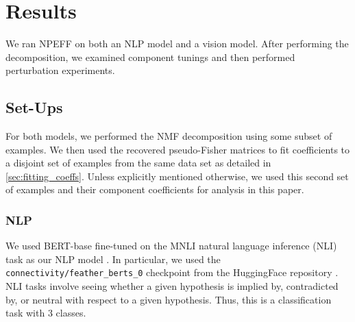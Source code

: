 \documentclass[dvipsnames]{article}
\begin{document}




\section{Results}
We ran NPEFF on both an NLP model and a vision model.
After performing the decomposition, we examined component tunings and then performed perturbation experiments.

\subsection{Set-Ups}
For both models, we performed the NMF decomposition using some subset of examples. We then used the recovered pseudo-Fisher matrices to fit coefficients to a disjoint set of examples from the same data set as detailed in \cref{sec:fitting_coeffs}. Unless explicitly mentioned otherwise, we used this second set of examples and their component coefficients for analysis in this paper.

\subsubsection{NLP}
We used BERT-base fine-tuned on the MNLI natural language inference (NLI) task as our NLP model \citep{devlin2018bert, mnli}.
In particular, we used the \texttt{connectivity/feather\_berts\_0} checkpoint from the HuggingFace repository \citep{mccoy2019berts, wolf2019huggingface}.
NLI tasks involve seeing whether a given hypothesis is implied by, contradicted by, or neutral with respect to a given hypothesis.
Thus, this is a classification task with 3 classes.
\end{document}

